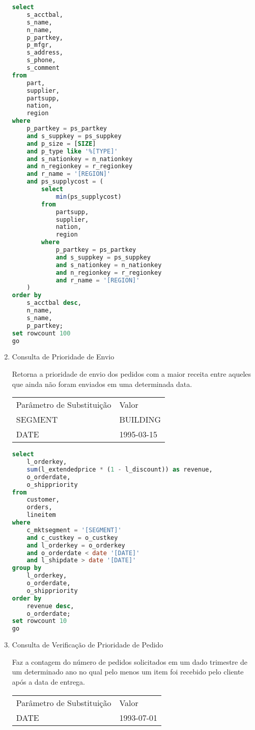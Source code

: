 \begin{enumerate}
	\begin{lstlisting}[language=SQL]
select
	s_acctbal,
	s_name,
	n_name,
	p_partkey,
	p_mfgr,
	s_address,
	s_phone,
	s_comment
from
	part,
	supplier,
	partsupp,
	nation,
	region
where
	p_partkey = ps_partkey
	and s_suppkey = ps_suppkey
	and p_size = [SIZE]
	and p_type like '%[TYPE]'
	and s_nationkey = n_nationkey
	and n_regionkey = r_regionkey
	and r_name = '[REGION]'
	and ps_supplycost = (
		select
			min(ps_supplycost)
		from
			partsupp,
			supplier,
			nation,
			region
		where
			p_partkey = ps_partkey
			and s_suppkey = ps_suppkey
			and s_nationkey = n_nationkey
			and n_regionkey = r_regionkey
			and r_name = '[REGION]'
	)
order by
	s_acctbal desc,
	n_name,
	s_name,
	p_partkey;
set rowcount 100
go
	\end{lstlisting}

\item Consulta de Prioridade de Envio
	
	Retorna a prioridade de envio dos pedidos com a maior receita entre aqueles que ainda não foram enviados em uma determinada data.
	
\begin{tabular}{ll}
	Parâmetro de Substituição & Valor\\
	SEGMENT & BUILDING\\
	DATE & 1995-03-15\\
\end{tabular}

	\begin{lstlisting}[language=SQL]
select
	l_orderkey,
	sum(l_extendedprice * (1 - l_discount)) as revenue,
	o_orderdate,
	o_shippriority
from
	customer,
	orders,
	lineitem
where
	c_mktsegment = '[SEGMENT]'
	and c_custkey = o_custkey
	and l_orderkey = o_orderkey
	and o_orderdate < date '[DATE]'
	and l_shipdate > date '[DATE]'
group by
	l_orderkey,
	o_orderdate,
	o_shippriority
order by
	revenue desc,
	o_orderdate;
set rowcount 10
go
	\end{lstlisting}
	
\item Consulta de Verificação de Prioridade de Pedido
		
	Faz a contagem do número de pedidos solicitados em um dado trimestre de um determinado ano no qual pelo menos um item foi recebido pelo cliente após a data de entrega.
	
\begin{tabular}{ll}
	Parâmetro de Substituição & Valor\\
	DATE & 1993-07-01\\
\end{tabular}


\end{enumerate}

